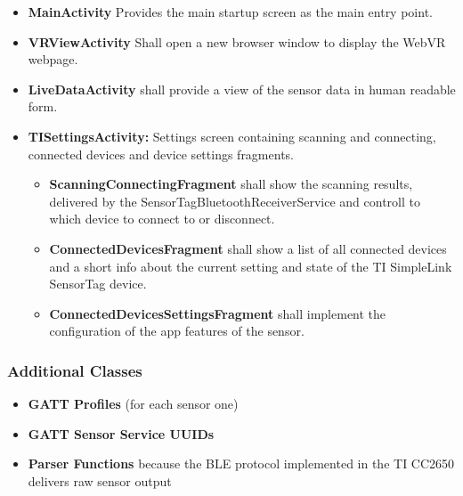 \begin{itemize}
  \item \textbf{MainActivity} Provides the main startup screen as the main entry point.
  \item \textbf{VRViewActivity} Shall open a new browser window to display the WebVR webpage.
  \item \textbf{LiveDataActivity} shall provide a view of the sensor data in human readable form.
  \item \textbf{TISettingsActivity:} Settings screen containing scanning and connecting, connected devices and device settings fragments.
  \begin{itemize}
    \item \textbf{ScanningConnectingFragment} shall show the scanning results, delivered by the SensorTagBluetoothReceiverService and controll to which device to connect to or disconnect.
    \item \textbf{ConnectedDevicesFragment} shall show a list of all connected devices and a short info about the current setting and state of the TI SimpleLink SensorTag device.
    \item \textbf{ConnectedDevicesSettingsFragment} shall implement the configuration of the app features of the sensor.
  \end{itemize}
\end{itemize}

\subsubsection{Additional Classes}
\begin{itemize}
  \item \textbf{GATT Profiles} (for each sensor one)
  \item \textbf{GATT Sensor Service UUIDs}
  \item \textbf{Parser Functions} because the BLE protocol implemented in the TI CC2650 delivers raw sensor output
\end{itemize}
